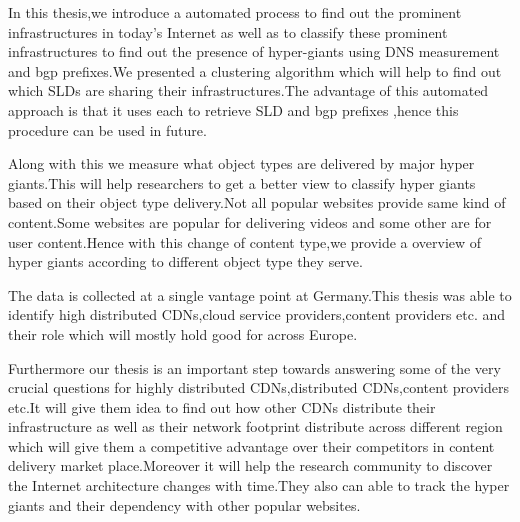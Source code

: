 In this thesis,we introduce a automated process to find out the prominent infrastructures in today's Internet as well as to classify these prominent infrastructures to find out the presence of hyper-giants using DNS measurement and bgp prefixes.We presented a clustering algorithm which will help to find out which SLDs are sharing their infrastructures.The advantage of this automated approach is that it uses each to retrieve SLD and bgp prefixes ,hence this procedure can be used in future.

Along with this we measure what object types are delivered by major hyper giants.This will help researchers to get a better view to classify hyper giants based on their object type delivery.Not all popular websites provide same kind of content.Some websites are popular for delivering videos and some other are for user content.Hence with this change of content type,we provide a overview of hyper giants according to different object type they serve.

The data is collected at a single vantage point at Germany.This thesis was able to identify high distributed CDNs,cloud service providers,content providers etc. and their role which will mostly hold good for across Europe.

Furthermore our thesis is an important step towards answering some of the very crucial questions for highly distributed CDNs,distributed CDNs,content providers etc.It will give them idea to find out how other CDNs distribute their infrastructure as well as their network footprint distribute across different region which will give them a competitive advantage over their competitors in content delivery market place.Moreover it will help the research community to discover the Internet architecture changes with time.They also can able to track the hyper giants and their dependency with other popular websites.
